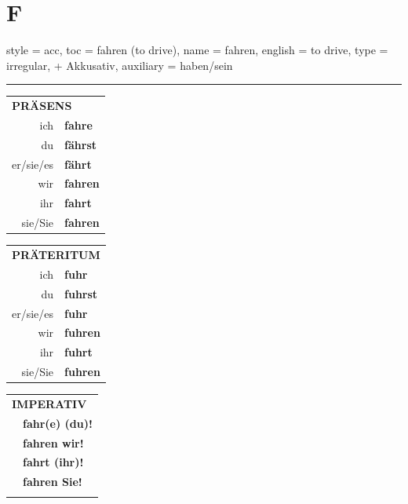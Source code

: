 \section{F}

\begin{verbentry}{
  style = {acc},
  toc = {fahren (to drive)},
  name = {fahren},
  english = {to drive},
  type = {irregular, + Akkusativ},
  auxiliary = {haben/sein}
}
 
    
     \vspace{5pt}

    \hrule
    
    \vspace{5pt}

  \begin{tabular}{rl}
     \multicolumn{2}{l}{\textbf{PRÄSENS} }\\
    ich & \textbf{fahre}\\
    du & \textbf{f\"ahrst}\\
    er/sie/es & \textbf{f\"ahrt}\\
    wir & \textbf{fahren}\\
    ihr & \textbf{fahrt}\\
    sie/Sie & \textbf{fahren}\\
  \end{tabular}
  \hfill
     \begin{tabular}{rl}
    \multicolumn{2}{l}{\textbf{PRÄTERITUM} }\\
    ich & \textbf{fuhr}\\
    du & \textbf{fuhrst}\\
    er/sie/es & \textbf{fuhr}\\
    wir & \textbf{fuhren}\\
    ihr & \textbf{fuhrt}\\
    sie/Sie & \textbf{fuhren}\\
  \end{tabular}
  \hfill
  \begin{tabular}{rl}
     \multicolumn{2}{l}{\textbf{IMPERATIV} }\\
   & \textbf{fahr(e) (du)!}\\
   & \textbf{fahren wir!}\\
   & \textbf{fahrt (ihr)!}\\
   & \textbf{fahren Sie!}\\
   & \vspace{10pt}
  \end{tabular}

    \vspace{10pt}


\end{verbentry}

